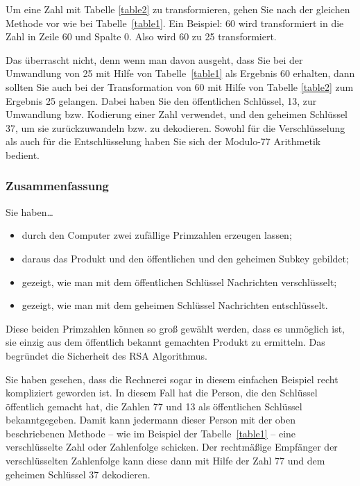 \documentclass[a4paper,11pt, oneside,openright,titlepage,dvips]{scrbook}
\newcounter{chapter}
\newcounter{section}[chapter]
\begin{document}
Um eine Zahl mit Tabelle \ref{table2} zu transformieren, gehen Sie nach der
gleichen Methode vor wie bei Tabelle~\ref{table1}. Ein Beispiel: 60 wird
transformiert in die Zahl in Zeile 60 und Spalte 0. Also wird 60 zu 25
transformiert.

Das überrascht nicht, denn wenn man davon ausgeht, dass Sie bei der
Umwandlung von 25 mit Hilfe von Tabelle~\ref{table1} als Ergebnis 60 erhalten,
dann sollten Sie auch bei der Transformation von 60 mit Hilfe von
Tabelle \ref{table2} zum Ergebnis 25 gelangen. Dabei haben Sie den öffentlichen
Schlüssel, 13, zur Umwandlung bzw. Kodierung einer Zahl verwendet,
und den geheimen Schlüssel 37, um sie zurückzuwandeln bzw. zu
dekodieren. Sowohl für die Verschlüsselung als auch für die
Entschlüsselung haben Sie sich der Modulo-77 Arithmetik bedient.

\clearpage
\subsubsection{Zusammenfassung}

Sie haben\ldots
\begin{itemize}
\item durch den Computer zwei zufällige Primzahlen erzeugen lassen;

\item daraus das Produkt und den öffentlichen und den geheimen Subkey
  gebildet;

\item gezeigt, wie man mit dem öffentlichen Schlüssel Nachrichten
  verschlüsselt;

\item gezeigt, wie man mit dem geheimen Schlüssel Nachrichten
  entschlüsselt.
\end{itemize}

Diese beiden Primzahlen können so groß gewählt werden, dass es
unmöglich ist, sie einzig aus dem öffentlich bekannt gemachten Produkt
zu ermitteln. Das begründet die Sicherheit des RSA Algorithmus.

Sie haben gesehen, dass die Rechnerei sogar in diesem einfachen
Beispiel recht kompliziert geworden ist. In diesem Fall hat die
Person, die den Schlüssel öffentlich gemacht hat, die Zahlen 77 und 13
als öffentlichen Schlüssel bekanntgegeben.  Damit kann jedermann dieser
Person mit der oben beschriebenen Methode --­ wie im Beispiel der
Tabelle~\ref{table1} --­ eine verschlüsselte Zahl oder Zahlenfolge schicken. Der
rechtmäßige Empfänger der verschlüsselten Zahlenfolge kann diese dann
mit Hilfe der Zahl 77 und dem geheimen Schlüssel 37 dekodieren.
\end{document}
